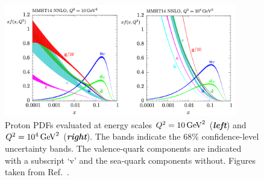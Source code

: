 \begin{figure}
    \begin{center}
        \includegraphics[width=0.9\textwidth]{figures/event_simulation/pdfs_lhc}
        \caption{
            Proton PDFs evaluated at energy scales $Q^2 = 10\,\text{Ge\kern -0.1em V}^2$ (\textbf{\textit{left}}) and $Q^2 = 10^4\,\text{Ge\kern -0.1em V}^2$ (\textbf{\textit{right}}).
            The bands indicate the 68\% confidence-level uncertainty bands.
            The valence-quark components are indicated with a subscript `v' and the sea-quark components without.
            Figures taken from Ref.~\cite{Harland-Lang:2014zoa}.
        }
        \label{fig:pdfs_lhc}
    \end{center}
\end{figure}


